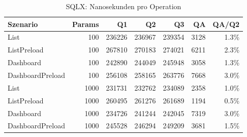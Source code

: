 \begin{table}[ht]
\centering
\caption{SQLX: Nanosekunden pro Operation}
\begin{tabular}{lrrrrrr}
\toprule
Szenario & Params & Q1 & Q2 & Q3 & QA & QA/Q2 \\
\midrule
		List & 100 & 236226 & 236967 & 239354 & 3128 & 1.3\% \\
		ListPreload & 100 & 267810 & 270183 & 274021 & 6211 & 2.3\% \\
		Dashboard & 100 & 242890 & 244049 & 245948 & 3058 & 1.3\% \\
		DashboardPreload & 100 & 256108 & 258165 & 263776 & 7668 & 3.0\% \\
		List & 1000 & 231731 & 232762 & 234089 & 2358 & 1.0\% \\
		ListPreload & 1000 & 260495 & 261276 & 261689 & 1194 & 0.5\% \\
		Dashboard & 1000 & 234726 & 241244 & 242045 & 7319 & 3.0\% \\
		DashboardPreload & 1000 & 245528 & 246294 & 249209 & 3681 & 1.5\% \\
\bottomrule
\end{tabular}
\label{tab:benchmark_sqlx_nsperop}
\end{table}
	